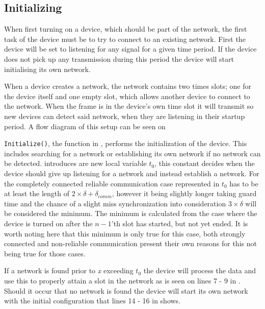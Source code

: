 \subsection{Initializing} %
\label{sub:setupCCRC} 
When first turning on a device, which should be part of the network, the first task of the device must be to try to connect to an existing network.
First the device will be set to listening for any signal for a given time period. 
If the device does not pick up any transmission during this period the device will start initialising its own network.

When a device creates a network, the network contains two times slots; one for the device itself and one empty slot, which allows another device to connect to the network.
When the frame is in the device's own time slot it will transmit so new devices can detect said network, when they are listening in their startup period.  
A flow diagram of this setup can be seen on 

 
\bigskip \noindent
\texttt{Initialize()}, the function in , performs the initialization of the device.
This includes searching for a network or establishing its own network if no network can be detected.
 introduces are new local variable $t_0$, this constant decides when the device should give up listening for a network and instead establish a network.
For the completely connected reliable communication case represented in  $t_0$ has to be at least the length of $2 \times \delta + \delta_{comm}$, however it being slightly longer taking guard time and the chance of a slight miss synchronization into consideration $3 \times \delta$ will be considered the minimum.
The minimum is calculated from the case where the device is turned on after the $n-1$'th slot has started, but not yet ended.
It is worth noting here that this minimum is only true for this case, both strongly connected and non-reliable communication present their own reasons for this not being true for those cases.

If a network is found prior to \textit{x} exceeding $t_0$ the device will process the data and use this to properly attain a slot in the network as is seen on lines 7 - 9 in .
Should it occur that no network is found the device will start its own network with the initial configuration that lines 14 - 16 in  shows.

